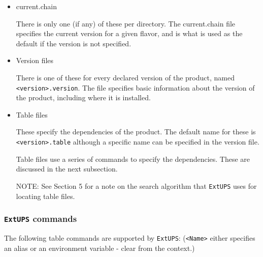\documentclass{article}
\newcommand{\code}[1]{\texttt{#1}}
\newcommand{\file}[1]{\texttt{#1}}
\newcommand{\eups}{\code{ExtUPS}}
\begin{document}
\begin{itemize}
  \item current.chain

    There is only one (if any) of these per directory.  The
    current.chain file specifies the current version for a given
    flavor, and is what is used as the default if the version is not
    specified.

  \item Version files

    There is one of these for every declared version of the product,
    named \file{<version>.version}. The file specifies basic information
    about the version of the product, including where it is installed.

  \item Table files

    These specify the dependencies of the product. The default name
    for these is \file{<version>.table} although a specific name can be specified in the
    version file.

    Table files use a series of commands to specify the dependencies. These are
    discussed in the next subsection.

    NOTE: See Section 5 for a note on the search algorithm that \eups{} uses for 
    locating table files.
\end{itemize}

\subsubsection{\eups{} commands}

The following table commands are supported by \eups{}: (\code{<Name>} either specifies an
alias or an environment variable - clear from the context.)
\end{document}

